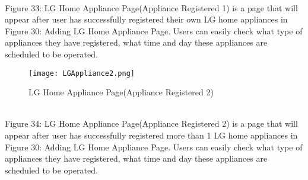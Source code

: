 \documentclass[conference]{IEEEtran}
\begin{document}
\\
\indent Figure 33: LG Home Appliance Page(Appliance Registered 1) is a page that will appear after user has successfully registered their own LG home appliances in Figure 30: Adding LG Home Appliance Page. Users can easily check what type of appliances they have registered, what time and day these appliances are scheduled to be operated.
\\
\begin{figure}[h]
\centerline{\texttt{[image: LGAppliance2.png]}}
\caption{LG Home Appliance Page(Appliance Registered 2)}
\label{fig}
\end{figure}
\\
Figure 34: LG Home Appliance Page(Appliance Registered 2) is a page that will appear after user has successfully registered more than 1 LG home appliances in Figure 30: Adding LG Home Appliance Page. Users can easily check what type of appliances they have registered, what time and day these appliances are scheduled to be operated.
\\
\end{document}
